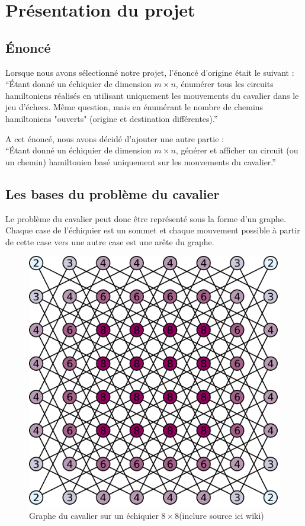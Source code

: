 \section{Présentation du projet}

\subsection{Énoncé}
Lorsque nous avons sélectionné notre projet, l'énoncé d'origine était le suivant : \\
\enquote{Étant donné un échiquier de dimension $m \times n$, énumérer tous les circuits hamiltoniens réalisés en utilisant uniquement les mouvements du cavalier dans le jeu d'échecs. Même question, mais en énumérant le nombre de chemins hamiltoniens "ouverts" (origine et destination différentes).}

A cet énoncé, nous avons décidé d'ajouter une autre partie : \\
\enquote{Étant donné un échiquier de dimension $m \times n$, générer et afficher un circuit (ou un chemin) hamiltonien basé uniquement sur les mouvements du cavalier.}
\subsection{Les bases du problème du cavalier}
Le problème du cavalier peut donc être représenté sous la forme d'un graphe. Chaque case de l'échiquier est un sommet et chaque mouvement possible à partir de cette case vers une autre case est une arête du graphe.

\begin{figure}[h]
\begin{center}
   \includegraphics[scale=0.25]{img/graph_cavalier.png} 
   \caption{\label{cavalier_graphe} Graphe du cavalier sur un échiquier $8 \times 8$(inclure source ici wiki)}
   \end{center}
\end{figure}

